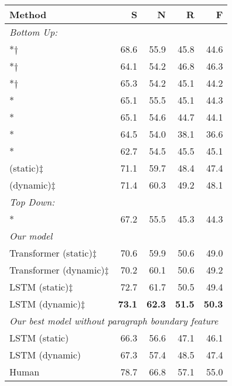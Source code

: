 \documentclass[11pt,a4paper]{article}
\newcommand{\sentfeat}{\ensuremath{\dagger}}
\newcommand{\parafeat}{\ensuremath{\ddagger}}
\begin{document}
\begin{table}[t]
	\begin{center}
		\begin{adjustbox}{max width=0.95\linewidth}
			\begin{tabular}{lrrrr}
				\toprule
				\textbf{Method} & \textbf{S} & \textbf{N} & \textbf{R} & \textbf{F} \\
				\midrule
				\multicolumn{5}{l}{\textit{Bottom Up: }}\\
				\citet{feng-hirst-2014-linear}*\sentfeat & 68.6 & 55.9 & 45.8 & 44.6 \\
				\citet{ji-eisenstein-2014-representation}*\sentfeat & 64.1 & 54.2 & 46.8 & 46.3 \\
				\citet{surdeanu-etal-2015-two}*\sentfeat & 65.3 & 54.2 & 45.1 & 44.2 \\
				\citet{joty-etal-2015-codra}* &  65.1 & 55.5 & 45.1 & 44.3\\
				\citet{hayashi-etal-2016-empirical}* & 65.1 & 54.6 & 44.7 & 44.1\\
				\citet{li-etal-2016-discourse}* & 64.5 & 54.0 & 38.1 & 36.6\\
				\citet{braud-etal-2017-cross-lingual}* & 62.7 & 54.5 & 45.5 & 45.1\\
				\citet{yu2018transition} (static)\parafeat & 71.1 & 59.7 & 48.4 & 47.4 \\
				\citet{yu2018transition} (dynamic)\parafeat & 71.4 & 60.3 & 49.2 & 48.1 \\
				\midrule
				\multicolumn{5}{l}{\textit{Top Down: }}\\
				\citet{zhang-etal-2020-top}* & 67.2 & 55.5 & 45.3 & 44.3 \\
\midrule
				\multicolumn{5}{l}{\textit{Our model}}\\
				Transformer (static)\parafeat & 70.6 & 59.9 & 50.6 & 49.0\\
				Transformer (dynamic)\parafeat & 70.2 & 60.1 & 50.6 & 49.2\\
				LSTM (static)\parafeat & 72.7 & 61.7 & 50.5 & 49.4 \\
				LSTM (dynamic)\parafeat & \textbf{73.1} & \textbf{62.3} & \textbf{51.5} & \textbf{50.3} \\
				\midrule
				\multicolumn{5}{l}{\textit{Our best model without paragraph boundary feature}}\\
				LSTM (static) & 66.3 & 56.6 & 47.1 & 46.1 \\
				LSTM (dynamic) & 67.3 & 57.4 & 48.5 & 47.4 \\
				\midrule
				Human & 78.7 & 66.8 & 57.1 & 55.0 \\

\end{tabular}
\end{adjustbox}
\end{center}
\end{table}
\end{document}
